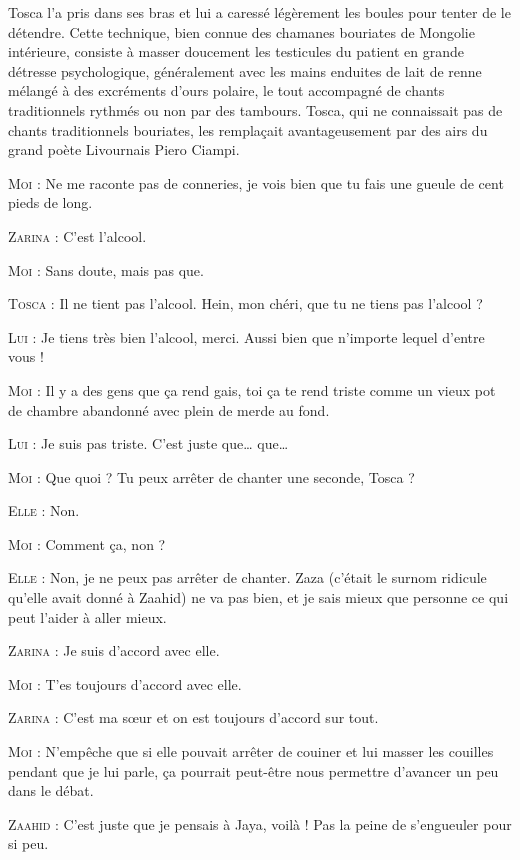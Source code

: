 Tosca l’a pris dans ses bras et lui a caressé légèrement les boules pour tenter de le détendre. Cette technique, bien connue des chamanes bouriates de Mongolie intérieure, consiste à masser doucement les testicules du patient en grande détresse psychologique, généralement avec les mains enduites de lait de renne mélangé à des excréments d’ours polaire, le tout accompagné de chants traditionnels rythmés ou non par des tambours. Tosca, qui ne connaissait pas de chants traditionnels bouriates, les remplaçait avantageusement par des airs du grand poète Livournais Piero Ciampi.

\begin{dialogue}

\textsc{Moi} : Ne me raconte pas de conneries, je vois bien que tu fais une gueule de cent pieds de long.

\textsc{Zarina} : C’est l’alcool.

\textsc{Moi} : Sans doute, mais pas que.

\textsc{Tosca} : Il ne tient pas l’alcool. Hein, mon chéri, que tu ne tiens pas l’alcool ?

\textsc{Lui} : Je tiens très bien l’alcool, merci. Aussi bien que n’importe lequel d’entre vous !

\textsc{Moi} : Il y a des gens que ça rend gais, toi ça te rend triste comme un vieux pot de chambre abandonné avec plein de merde au fond.

\textsc{Lui} : Je suis pas triste. C’est juste que… que…

\textsc{Moi} : Que quoi ? Tu peux arrêter de chanter une seconde, Tosca ?

\textsc{Elle} : Non.

\textsc{Moi} : Comment ça, non ?

\textsc{Elle} : Non, je ne peux pas arrêter de chanter. Zaza (c’était le surnom ridicule qu’elle avait donné à Zaahid) ne va pas bien, et je sais mieux que personne ce qui peut l’aider à aller mieux.

\textsc{Zarina} : Je suis d’accord avec elle.

\textsc{Moi} : T’es toujours d’accord avec elle.

\textsc{Zarina} : C’est ma sœur et on est toujours d’accord sur tout.

\textsc{Moi} : N’empêche que si elle pouvait arrêter de couiner et lui masser les couilles pendant que je lui parle, ça pourrait peut-être nous permettre d’avancer un peu dans le débat.

\textsc{Zaahid} : C’est juste que je pensais à Jaya, voilà ! Pas la peine de s’engueuler pour si peu.

\end{dialogue}

